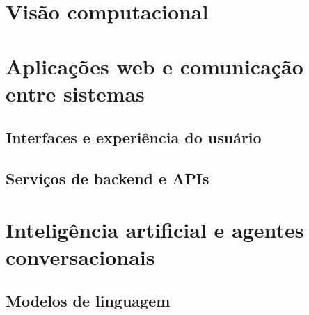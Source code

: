 
\section{Visão computacional}
\label{sec:visao_computacional}


\section{Aplicações web e comunicação entre sistemas}
\label{sec:aplicacoes_web}


\subsection{Interfaces e experiência do usuário}
\label{subsec:interface_usuario}


\subsection{Serviços de backend e APIs}
\label{subsec:backend_apis}


\section{Inteligência artificial e agentes conversacionais}
\label{sec:inteligencia_artificial}


\subsection{Modelos de linguagem}
\label{subsec:modelos_linguagem}


